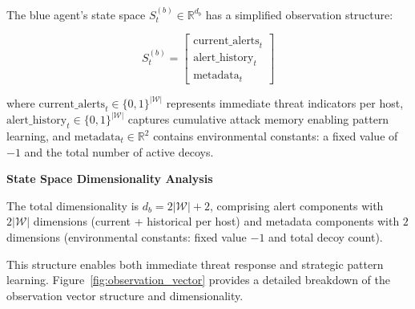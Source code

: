 \documentclass[12pt,oneside]{article}
\begin{document}
The blue agent's state space $S^{(b)}_t \in \mathbb{R}^{d_b}$ has a simplified observation structure:

\begin{equation}
S^{(b)}_t = \begin{bmatrix}
\text{current\_alerts}_t \\
\text{alert\_history}_t \\
\text{metadata}_t
\end{bmatrix}
\end{equation}

where $\text{current\_alerts}_t \in \{0,1\}^{|\mathcal{W}|}$ represents immediate threat indicators per host, $\text{alert\_history}_t \in \{0,1\}^{|\mathcal{W}|}$ captures cumulative attack memory enabling pattern learning, and $\text{metadata}_t \in \mathbb{R}^2$ contains environmental constants: a fixed value of $-1$ and the total number of active decoys.

\textbf{State Space Dimensionality Analysis}

The total dimensionality is $d_b = 2|\mathcal{W}| + 2$, comprising alert components with $2|\mathcal{W}|$ dimensions (current + historical per host) and metadata components with $2$ dimensions (environmental constants: fixed value $-1$ and total decoy count).

This structure enables both immediate threat response and strategic pattern learning. Figure~\ref{fig:observation_vector} provides a detailed breakdown of the observation vector structure and dimensionality.
\end{document}
